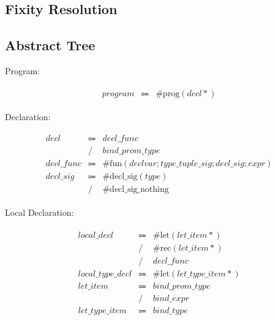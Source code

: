 \subsection{Fixity Resolution}

\subsection{Abstract Tree}

Program:

\begin{align*}
    \begin{array}{rcll}
        \mathit{program}
        &\Coloneq &\mathrm{\#prog}(\mathit{decl}*)
    \end{array}
\end{align*}

Declaration:

\begin{align*}
    \begin{array}{rcll}
        \mathit{decl}
        &\Coloneq &\mathit{decl\_func} \\
        &\mathrel{/} &\mathit{bind\_prom\_type} \\
        \mathit{decl\_func}
        &\Coloneq &\mathrm{\#fun}(\mathit{declvar}; \mathit{type\_tuple\_sig}; \mathit{decl\_sig}; \mathit{expr}) \\
        \mathit{decl\_sig}
        &\Coloneq &\mathrm{\#decl\_sig}(\mathit{type}) \\
        &\mathrel{/} &\mathrm{\#decl\_sig\_nothing}
    \end{array}
\end{align*}

Local Declaration:

\begin{align*}
    \begin{array}{rcll}
        \mathit{local\_decl}
        &\Coloneq &\mathrm{\#let}(\mathit{let\_item}{*}) \\
        &\mathrel{/} &\mathrm{\#rec}(\mathit{let\_item}{*}) \\
        &\mathrel{/} &\mathit{decl\_func} \\
        \mathit{local\_type\_decl}
        &\Coloneq &\mathrm{\#let}(\mathit{let\_type\_item}{*}) \\
        \mathit{let\_item}
        &\Coloneq &\mathit{bind\_prom\_type} \\
        &\mathrel{/} &\mathit{bind\_expr} \\
        \mathit{let\_type\_item}
        &\Coloneq &\mathit{bind\_type} \\
    \end{array}
\end{align*}

